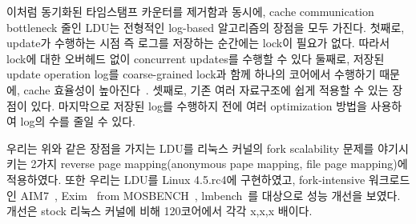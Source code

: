 \ifkor
이처럼 동기화된 타임스탬프 카운터를 제거함과 동시에, cache communication bottleneck 줄인
LDU는 전형적인 log-based 알고리즘의 장점을 모두 가진다.
첫째로, update가 수행하는 시점 즉 로그를 저장하는 순간에는 lock이 필요가 없다. 
따라서 lock에 대한 오버헤드 없이 concurrent updates를 수행할 수 있다
둘째로, 저장된 update operation log를 coarse-grained lock과 함께 하나의 코어에서 수행하기 때문에,
cache 효율성이 높아진다~\cite{Hendler2010FC}.
셋째로, 기존 여러 자료구조에 쉽게 적용할 수 있는 장점이 있다.
마지막으로 저장된 log를 수행하지 전에 여러 optimization 방법을 사용하여 log의 수를 줄일 수 있다. 
\else
\fi


\ifkor
우리는 위와 같은 장점을 가지는 LDU를 리눅스 커널의 fork scalability 문제를 야기시키는 2가지 reverse page
mapping(anonymous pape mapping, file page mapping)에 적용하였다.
또한 우리는 LDU를 Linux 4.5.rc4에 구현하였고, fork-intensive 워크로드인 AIM7~\cite{AIM7Benchmark}, Exim~\cite{Exim} from MOSBENCH~\cite{MOSBENCH},
lmbench~\cite{mcvoy1996lmbench}를 대상으로 성능 개선을 보였다. 개선은 stock 리눅스 커널에 비해 120코어에서
각각 x,x,x 배이다.
\else
\fi


